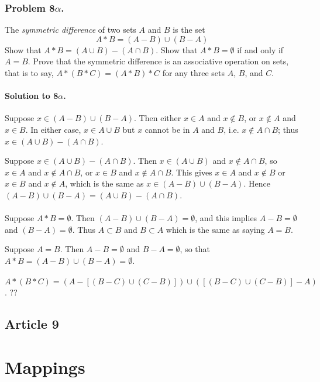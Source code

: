 \subsubsection{Problem 8$\alpha$.}
The \textit{symmetric difference} of two sets $A$ and $B$ is the set
$$ A*B = (A-B) \cup (B-A) $$
Show that $A*B = (A \cup B) - (A \cap B)$. Show that $A*B = \emptyset$ if and
only if $ A = B$. Prove that the symmetric difference is an associative
operation on sets, that is to say, $A*(B*C) = (A*B)*C$ for any three sets
$A$, $B$, and $C$.

\paragraph*{Solution to 8$\alpha$.}
Suppose $ x \in (A-B) \cup (B-A) $. Then either $x \in A$ and $ x \notin B$, or
$ x \notin A$ and $x \in B$. In either case, $x \in A \cup B$ but $x$ cannot
be in $A$ and $B$, i.e. $ x \notin A \cap B$; thus $x \in (A \cup B) - (A \cap B)$.

Suppose $x \in (A \cup B) - (A \cap B)$. Then $ x \in (A \cup B)$ and $x \notin
A \cap B$, so $ x \in A $ and $x \notin A \cap B$, or $ x \in B $ and $x \notin
A \cap B$. This gives $ x \in A $ and $ x \notin B $ or $x \in B $ and $x \notin
A $, which is the same as $x \in (A-B) \cup (B -A)$. Hence $(A-B) \cup (B-A) =
(A \cup B) - (A \cap B)$.

\paragraph{}
Suppose $A*B = \emptyset$. Then $(A-B) \cup (B-A) = \emptyset$, and this implies
$ A-B = \emptyset$ and $(B-A) = \emptyset$. Thus $ A \subset B $ and $ B \subset A$
which is the same as saying $A = B$.

Suppose $A = B$. Then $A - B = \emptyset$ and $B - A = \emptyset$, so that
$A*B = (A-B) \cup (B-A) = \emptyset$.

\paragraph{}
$A*(B*C) = (A-[(B-C) \cup (C-B)]) \cup ([(B-C) \cup (C-B)]-A)$. ??

\subsection{Article 9}


\section{Mappings}


